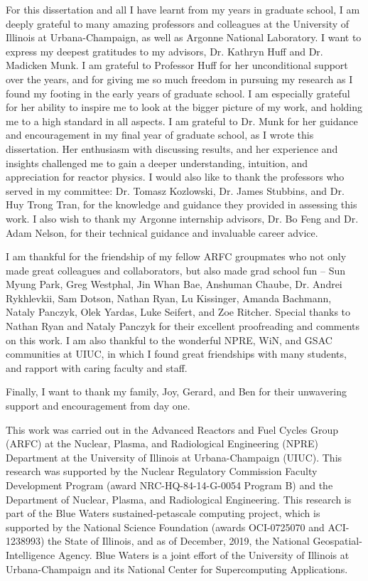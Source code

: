 For this dissertation and all I have learnt from my years in graduate school, 
I am deeply grateful to many amazing professors and colleagues at the University of 
Illinois at Urbana-Champaign, as well as Argonne National Laboratory. 
I want to express my deepest gratitudes to my advisors, Dr. Kathryn Huff and Dr. 
Madicken Munk. 
I am grateful to Professor Huff for her unconditional support over the years, and for 
giving me so much freedom in pursuing my research as I found my footing in the early 
years of graduate school. 
I am especially grateful for her ability to inspire me to look at the bigger picture of 
my work, and holding me to a high standard in all aspects.
I am grateful to Dr. Munk for her guidance and encouragement in my final year 
of graduate school, as I wrote this dissertation. 
Her enthusiasm with discussing results, and her experience and insights challenged me to 
gain a deeper understanding, intuition, and appreciation for reactor physics.  
I would also like to thank the professors who served in my committee: Dr. Tomasz 
Kozlowski, Dr. James Stubbins, and Dr. Huy Trong Tran, for the knowledge and guidance 
they provided in assessing this work. 
I also wish to thank my Argonne internship advisors, Dr. Bo Feng and Dr. Adam Nelson, 
for their technical guidance and invaluable career advice. 

I am thankful for the friendship of my fellow ARFC 
groupmates who not only made great colleagues and collaborators, but also made 
grad school fun -- Sun Myung Park, Greg Westphal, Jin Whan Bae, Anshuman Chaube, 
Dr. Andrei Rykhlevkii, Sam Dotson, Nathan Ryan, Lu Kissinger, Amanda Bachmann, 
Nataly Panczyk, Olek Yardas, Luke Seifert, and Zoe Ritcher. 
Special thanks to Nathan Ryan and Nataly Panczyk for their excellent proofreading 
and comments on this work. 
I am also thankful to the wonderful NPRE, WiN, and GSAC communities at UIUC, in which 
I found great friendships with many students, and rapport with caring faculty and staff. 

Finally, I want to thank my family, Joy, Gerard, and Ben for their unwavering support 
and encouragement from day one. 

This work was carried out in the Advanced Reactors and Fuel Cycles Group (ARFC) at the 
Nuclear, Plasma, and Radiological Engineering (NPRE) Department at the University of 
Illinois at Urbana-Champaign (UIUC). 
This research was supported by the Nuclear Regulatory Commission Faculty Development 
Program (award NRC-HQ-84-14-G-0054 Program B) and the Department of Nuclear, Plasma, 
and Radiological Engineering.
This research is part of the Blue Waters sustained-petascale computing project, 
which is supported by the National Science Foundation (awards OCI-0725070 and 
ACI-1238993) the State of Illinois, and as of December, 2019, the National 
Geospatial-Intelligence Agency. 
Blue Waters is a joint effort of the University of Illinois at Urbana-Champaign and 
its National Center for Supercomputing Applications.
